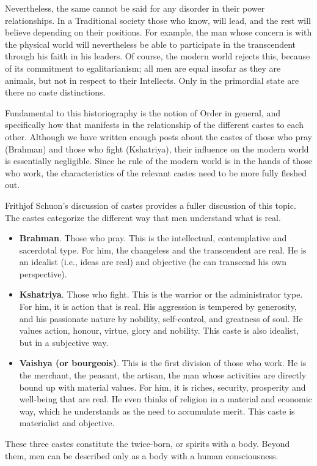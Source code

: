 Nevertheless, the same cannot be said for any disorder in their power relationships. In a Traditional society those who know, will lead, and the rest will believe depending on their positions. For example, the man whose concern is with the physical world will nevertheless be able to participate in the transcendent through his faith in his leaders. Of course, the modern world rejects this, because of its commitment to egalitarianism; all men are equal insofar as they are animals, but not in respect to their Intellects. Only in the primordial state are there no caste distinctions.

Fundamental to this historiography is the notion of Order in general, and specifically how that manifests in the relationship of the different castes to each other. Although we have written enough posts about the castes of those who pray (Brahman) and those who fight (Kshatriya), their influence on the modern world is essentially negligible. Since he rule of the modern world is in the hands of those who work, the characteristics of the relevant castes need to be more fully fleshed out.

Frithjof Schuon's discussion of castes provides a fuller discussion of this topic. The castes categorize the different way that men understand what is real.

\begin{itemize}
\item \textbf{Brahman}. Those who pray. This is the intellectual, contemplative and sacerdotal type. For him, the changeless and the transcendent are real. He is an idealist (i.e., ideas are real) and objective (he can transcend his own perspective). 
\item \textbf{Kshatriya}. Those who fight. This is the warrior or the administrator type. For him, it is action that is real. His aggression is tempered by generosity, and his passionate nature by nobility, self-control, and greatness of soul. He values action, honour, virtue, glory and nobility. This caste is also idealist, but in a subjective way. 
\item \textbf{Vaishya (or bourgeois)}. This is the first division of those who work. He is the merchant, the peasant, the artisan, the man whose activities are directly bound up with material values. For him, it is riches, security, prosperity and well-being that are real. He even thinks of religion in a material and economic way, which he understands as the need to accumulate merit. This caste is materialist and objective. 
\end{itemize}
These three castes constitute the twice-born, or spirits with a body. Beyond them, men can be described only as a body with a human consciousness.


